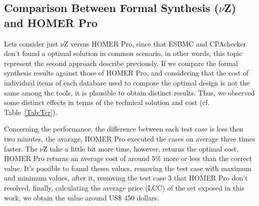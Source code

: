 \documentclass[10pt,journal,compsoc]{IEEEtran}
\begin{document}
\subsection{Comparison Between Formal Synthesis ($\nu$Z) and HOMER Pro}
  
Lets consider just $\nu$Z versus HOMER Pro, since that ESBMC and CPAchecker don't found a optimal solution in common scenario, in other words, this topic represent the second approach describe previously. If we compare the formal synthesis results against those of HOMER Pro, and considering that the cost of individual items of each database used to compose the optimal design is not the same among the tools, it is plausible to obtain distinct results. Thus, we observed some distinct effects in terms of the technical solution and cost (cf. Table~\ref{Tab:Tcr}). 

Concerning the performance, the difference between each test case is less then two minutes, the avarage, HOMER Pro executed the cases on average three times faster. The $\nu$Z take a little bit more time, however, returns the optimal cost, HOMER Pro returns an average cost of around 5\% more or less than the correct value. It's possible to found theses values, removing the test case with maximum and minimum values, after it, removing the test case 3 that HOMER Pro don’t resolved, finally, calculating the average price (LCC) of the set exposed in this work, we obtain the value around US\$ 450 dollars.
\end{document}
